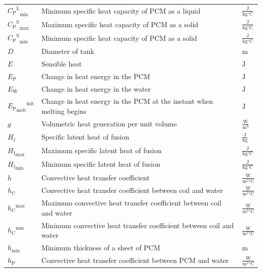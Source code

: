 \documentclass[12pt]{article}
\begin{document}
\begin{longtabu}{l X[l] l}
\\
${{{C_{\text{P}}}^{\text{L}}}_{\text{min}}}$ & Minimum specific heat capacity of PCM as a liquid & $\frac{\text{J}}{\text{kg}{}^{\circ}\text{C}}$
\\
${{{C_{\text{P}}}^{\text{S}}}_{\text{max}}}$ & Maximum specific heat capacity of PCM as a solid & $\frac{\text{J}}{\text{kg}{}^{\circ}\text{C}}$
\\
${{{C_{\text{P}}}^{\text{S}}}_{\text{min}}}$ & Minimum specific heat capacity of PCM as a solid & $\frac{\text{J}}{\text{kg}{}^{\circ}\text{C}}$
\\
$D$ & Diameter of tank & ${\text{m}}$
\\
$E$ & Sensible heat & ${\text{J}}$
\\
${E_{\text{P}}}$ & Change in heat energy in the PCM & ${\text{J}}$
\\
${E_{\text{W}}}$ & Change in heat energy in the water & ${\text{J}}$
\\
${{{E_{\text{P}}}_{\text{melt}}}^{\text{init}}}$ & Change in heat energy in the PCM at the instant when melting begins & ${\text{J}}$
\\
$g$ & Volumetric heat generation per unit volume & $\frac{\text{W}}{\text{m}^{3}}$
\\
${H_{\text{f}}}$ & Specific latent heat of fusion & $\frac{\text{J}}{\text{kg}}$
\\
${{H_{\text{f}}}_{\text{max}}}$ & Maximum specific latent heat of fusion & $\frac{\text{J}}{\text{kg}{}^{\circ}\text{C}}$
\\
${{H_{\text{f}}}_{\text{min}}}$ & Minimum specific latent heat of fusion & $\frac{\text{J}}{\text{kg}{}^{\circ}\text{C}}$
\\
$h$ & Convective heat transfer coefficient & $\frac{\text{W}}{\text{m}^{2}{}^{\circ}\text{C}}$
\\
${h_{\text{C}}}$ & Convective heat transfer coefficient between coil and water & $\frac{\text{W}}{\text{m}^{2}{}^{\circ}\text{C}}$
\\
${{h_{\text{C}}}^{\text{max}}}$ & Maximum convective heat transfer coefficient between coil and water & $\frac{\text{W}}{\text{m}^{2}{}^{\circ}\text{C}}$
\\
${{h_{\text{C}}}^{\text{min}}}$ & Minimum convective heat transfer coefficient between coil and water & $\frac{\text{W}}{\text{m}^{2}{}^{\circ}\text{C}}$
\\
${h_{\text{min}}}$ & Minimum thickness of a sheet of PCM & ${\text{m}}$
\\
${h_{\text{P}}}$ & Convective heat transfer coefficient between PCM and water & $\frac{\text{W}}{\text{m}^{2}{}^{\circ}\text{C}}$

\end{longtabu}
\end{document}
